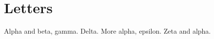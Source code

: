 \documentclass{article}
\begin{document}
\section{Letters}
Alpha and beta, gamma.
Delta.
\newpage
More alpha, epsilon.
\newpage
Zeta and alpha.
\printindex
\end{document}
